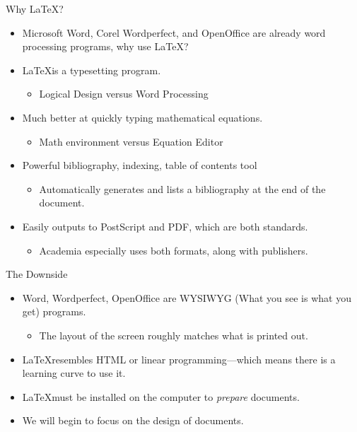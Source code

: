 \documentclass[pdf]{prosper}
\begin{document}
\begin{slide}{Why \LaTeX?}
	\begin{itemize}
		\item Microsoft Word, Corel Wordperfect, and OpenOffice are already word processing programs, why use \LaTeX?
		\item \LaTeX is a typesetting program.
			\begin{itemize}
				\item Logical Design versus Word Processing
			\end{itemize}
		\item Much better at quickly typing mathematical equations.			
			\begin{itemize}
				\item Math environment versus Equation Editor
			\end{itemize}
		\item Powerful bibliography, indexing, table of contents tool
			\begin{itemize}
				\item Automatically generates and lists a bibliography at the end of the document.
			\end{itemize}
		\item Easily outputs to PostScript and PDF, which are both standards.
			\begin{itemize}
				\item Academia especially uses both formats, along with publishers.
			\end{itemize}
	\end {itemize}
\end{slide}
\begin{slide}{The Downside}
	\begin{itemize}
		\item Word, Wordperfect, OpenOffice are WYSIWYG (What you see is what you get) programs.
			\begin{itemize}
				\item The layout of the screen roughly matches what is printed out.
			\end{itemize}
		\item \LaTeX resembles HTML or linear programming---which means there is a learning curve to use it.
		\item \LaTeX must be installed on the computer to \textit{prepare} documents.
		\item We will begin to focus on the design of documents.
	\end{itemize}
\end{slide}
\end{document}
